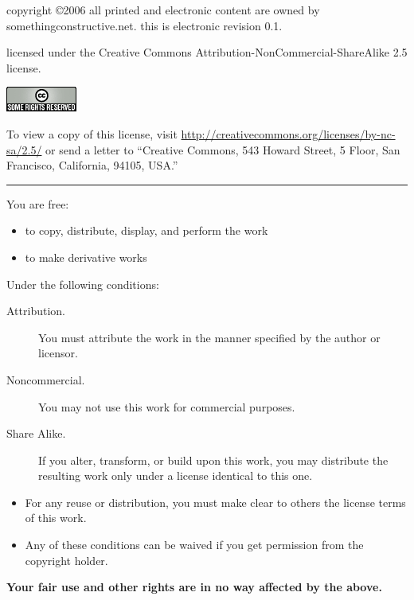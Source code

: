 \begin{center}

  copyright \copyright 2006 all printed and electronic content are
  owned by somethingconstructive.net.  this is electronic revision 0.1.

  \bigskip

  licensed under the Creative Commons
  Attribution-\-NonCommercial-\-ShareAlike 2.5 license.

  \medskip

  \includegraphics{cc.png}

  \medskip

  To view a copy of this license, visit
  \href{http://creativecommons.org/licenses/by-nc-sa/2.5/}{http://creativecommons.org/licenses/by-nc-sa/2.5/}
  or send a letter to ``Creative Commons, 543 Howard Street,
  5 Floor, San Francisco, California, 94105, USA.''

\rule{4cm}{1pt}

\end{center}

\noindent You are free:

\begin{itemize}
  \item to copy, distribute, display, and perform the work
  \item to make derivative works
\end{itemize}

\noindent Under the following conditions:

\begin{description}

  \item[Attribution.] You must attribute the work in the manner
  specified by the author or licensor.

  \item[Noncommercial.] You may not use this work for commercial purposes.

  \item[Share Alike.] If you alter, transform, or build upon this
  work, you may distribute the resulting work only under a license
  identical to this one.

\end{description}

\begin{itemize}

    \item For any reuse or distribution, you must make clear to others
    the license terms of this work.

    \item Any of these conditions can be waived if you get permission
    from the copyright holder.

\end{itemize}

\noindent\textbf{Your fair use and other rights are in no way affected
by the above.}

\clearpage
